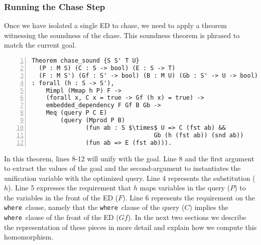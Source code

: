 \documentclass{sigplanconf}
\newcommand{\WHERE}{{\tt where}\relax\ifmmode\ \else\xspace\fi}
\begin{document}

\subsubsection{Running the Chase Step}
\label{sec:chase-step}

Once we have isolated a single ED to chase, we need to apply a theorem witnessing the soundness of the chase.
This soundness theorem is phrased to match the current goal.
\begin{lstlisting}[numbers=left]
Theorem chase_sound {S S' T U}
  (P : M S) (C : S -> bool) (E : S -> T)
  (F : M S') (Gf : S' -> bool) (B : M U) (Gb : S' -> U -> bool)
: forall (h : S -> S'),
    Mimpl (Mmap h P) F ->
    (forall x, C x = true -> Gf (h x) = true) ->
    embedded_dependency F Gf B Gb ->
    Meq (query P C E)
        (query (Mprod P B)
               (fun ab : S $\times$ U => C (fst ab) &&
                                  Gb (h (fst ab)) (snd ab))
               (fun ab => E (fst ab))).
\end{lstlisting}
In this theorem, lines 8-12 will unify with the goal.
Line 8 and the first argument to  extract the values of the goal and the second-argument to  instantiates the unification variable with the optimized query.
Line 4 represents the substitution ($h$).
Line 5 expresses the requirement that $h$ maps variables in the query ($P$) to the variables in the front of the ED ($F$).
Line 6 represents the requirement on the \WHERE clause, namely that the \WHERE clause of the query ($C$) implies the \WHERE clause of the front of the ED ($Gf$).
In the next two sections we describe the representation of these pieces in more detail and explain how we compute this homomorphism.
\end{document}

